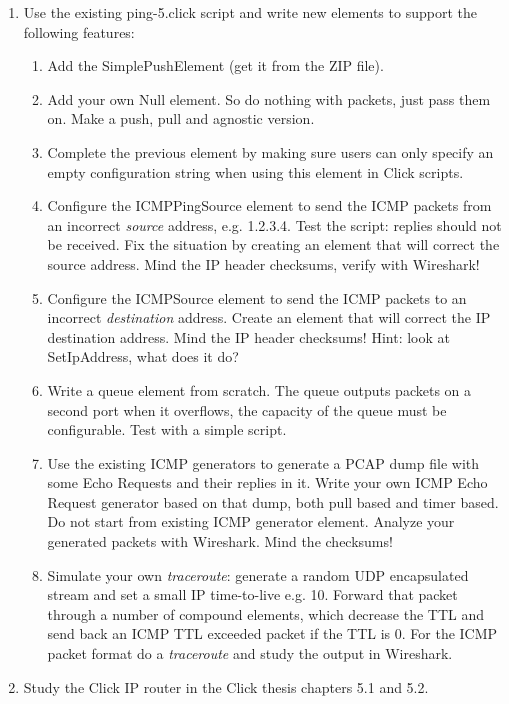 \documentclass[a4paper]{article}
\begin{document}
\begin{enumerate}
\item Use the existing ping-5.click script and write new elements to support the following features:

\begin{enumerate}
\item Add the SimplePushElement (get it from the ZIP file).
\item Add your own Null element. So do nothing with packets, just pass them on. Make a push, pull and agnostic version.
\item Complete the previous element by making sure users can only specify an empty configuration string when using this element in Click scripts.
\item Configure the ICMPPingSource element to send the ICMP packets from an incorrect \textit{source} address, e.g. 1.2.3.4. Test the script: replies should not be received. Fix the situation by creating an element that will correct the source address. Mind the IP header checksums, verify with Wireshark!
\item Configure the ICMPSource element to send the ICMP packets to an incorrect \textit{destination} address. Create an element that will correct the IP destination address. Mind the IP header checksums! Hint: look at SetIpAddress, what does it do?
\item Write a queue element from scratch. The queue outputs packets on a second port when it overflows, the capacity of the queue must be configurable. Test with a simple script.
\item Use the existing ICMP generators to generate a PCAP dump file with some Echo Requests and their replies in it. Write your own ICMP Echo Request generator based on that dump, both pull based and timer based. Do not start from existing ICMP generator element. Analyze your generated packets with Wireshark. Mind the checksums!
\item Simulate your own \emph{traceroute}: generate a random UDP encapsulated stream and set a small IP time-to-live e.g. 10. Forward that packet through a number of compound elements, which decrease the TTL and send back an ICMP TTL exceeded packet if the TTL is 0. For the ICMP packet format do a \emph{traceroute} and study the output in Wireshark.
\end{enumerate}

\item Study the Click IP router in the Click thesis chapters 5.1 and 5.2.

\end{enumerate}
\end{document}
